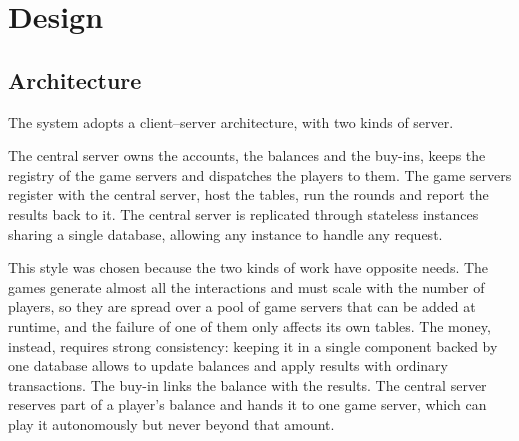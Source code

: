 \documentclass{scrartcl}
\begin{document}

\section{Design}\label{design}



\subsection{Architecture}\label{architecture}


The system adopts a client--server architecture, with two kinds of server.

The central server owns the accounts, the balances and the buy-ins, keeps the registry of the game servers and dispatches the players to them.
The game servers register with the central server, host the tables, run the rounds and report the results back to it.
The central server is replicated through stateless instances sharing a single database, allowing any instance to handle any request.

This style was chosen because the two kinds of work have opposite needs.
The games generate almost all the interactions and must scale with the number of players, 
so they are spread over a pool of game servers that can be added at runtime, and the failure of one of them only affects its own tables.
The money, instead, requires strong consistency: keeping it in a single component backed by one database allows to update balances and apply results with ordinary transactions.
The buy-in links the balance with the results. The central server reserves part of a player's balance and hands it to one game server, which can play it autonomously but never beyond that amount.
\end{document}
